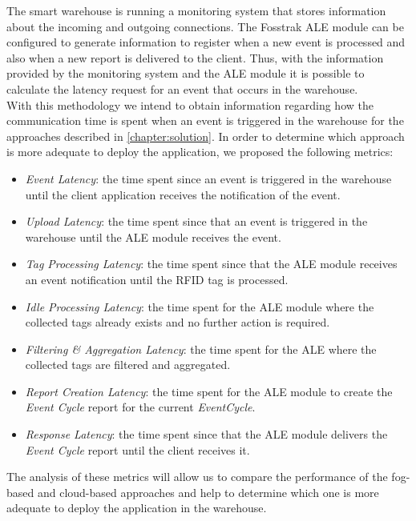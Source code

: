 The smart warehouse is running a monitoring system that stores information about the incoming and outgoing
connections. The Fosstrak \gls{ALE} module can be configured to generate information to register
when a new event is processed and also when a new report is delivered to the client. Thus, with the
information provided by the monitoring system and the \gls{ALE} module it is possible to calculate
the latency request for an event that occurs in the warehouse.\\

With this methodology we intend to obtain information regarding how the communication time is spent
when an event is triggered in the warehouse for the approaches described in \ref{chapter:solution}.
In order to determine which approach is more adequate to deploy the application, we proposed the
following metrics:

\begin{itemize}
  \item \textit{Event Latency}: the time spent since an event is triggered in the warehouse until
  the client application receives the notification of the event.
  \item \textit{Upload Latency}: the time spent since that an event is triggered in the warehouse until
  the \gls{ALE} module receives the event.
  \item \textit{Tag Processing Latency}: the time spent since that the \gls{ALE} module receives an event
  notification until the \gls{RFID} tag is processed.
  \item \textit{Idle Processing Latency}: the time spent for the \gls{ALE} module where the collected
  tags already exists and no further action is required.
  \item \textit{Filtering \& Aggregation Latency}: the time spent for the \gls{ALE} where the
  collected tags are filtered and aggregated.
  \item \textit{Report Creation Latency}: the time spent for the \gls{ALE} module to create the
  \textit{Event Cycle} report for the current \textit{EventCycle}.
  \item \textit{Response Latency}: the time spent since that the \gls{ALE} module delivers the
  \textit{Event Cycle} report until the client receives it.
\end{itemize}

The analysis of these metrics will allow us to compare the performance of the fog-based and cloud-based
approaches and help to determine which one is more adequate to deploy the application in the warehouse.

